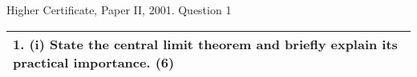 \documentclass[a4paper,12pt]{article}
\begin{document}
Higher Certificate, Paper II, 2001. Question 1
\begin{table}[ht!]
 
\centering
 
\begin{tabular}{|p{15cm}|}
 
\hline  

1. (i) State the central limit theorem and briefly explain its practical importance. (6) 


\\ \hline
  
\end{tabular}

\end{table}
\end{document}
